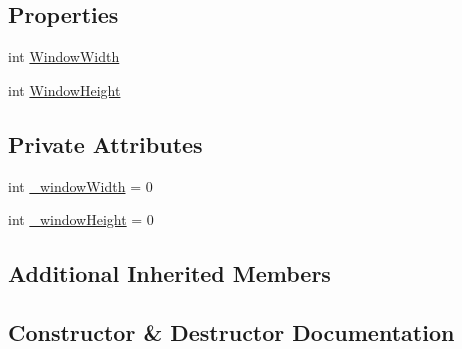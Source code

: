 \subsection*{Properties}
\begin{DoxyCompactItemize}
\item 
int \hyperlink{class_web_analyzer_1_1_models_1_1_event_model_1_1_resize_event_model_a4af3fc44a8ef02d431323fc2bce6c2e6}{Window\+Width}
\item 
int \hyperlink{class_web_analyzer_1_1_models_1_1_event_model_1_1_resize_event_model_ad65a672d91446cf683d40bbe83cd6c0b}{Window\+Height}
\end{DoxyCompactItemize}
\subsection*{Private Attributes}
\begin{DoxyCompactItemize}
\item 
int \hyperlink{class_web_analyzer_1_1_models_1_1_event_model_1_1_resize_event_model_a57e07c8f4dfe09d8ad8213760600e260}{\+\_\+window\+Width} = 0
\item 
int \hyperlink{class_web_analyzer_1_1_models_1_1_event_model_1_1_resize_event_model_ac7bc177aeb68fc0033b9d6f9061afc46}{\+\_\+window\+Height} = 0
\end{DoxyCompactItemize}
\subsection*{Additional Inherited Members}


\subsection{Constructor \& Destructor Documentation}
\hypertarget{class_web_analyzer_1_1_models_1_1_event_model_1_1_resize_event_model_ae60fbe903d44770db6d6f3999658eca2}{}
